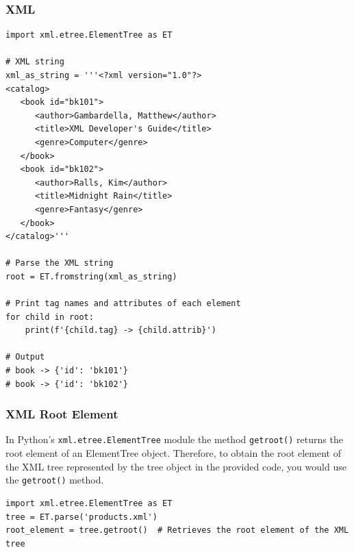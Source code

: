 
\subsubsection{XML}
\begin{codebox}
\begin{verbatim}
import xml.etree.ElementTree as ET

# XML string
xml_as_string = '''<?xml version="1.0"?>
<catalog>
   <book id="bk101">
      <author>Gambardella, Matthew</author>
      <title>XML Developer's Guide</title>
      <genre>Computer</genre>
   </book>
   <book id="bk102">
      <author>Ralls, Kim</author>
      <title>Midnight Rain</title>
      <genre>Fantasy</genre>
   </book>
</catalog>'''

# Parse the XML string
root = ET.fromstring(xml_as_string)

# Print tag names and attributes of each element
for child in root:
    print(f'{child.tag} -> {child.attrib}')

# Output
# book -> {'id': 'bk101'}
# book -> {'id': 'bk102'}
\end{verbatim}
\end{codebox}

\subsubsection{XML Root Element}

In Python's \texttt{xml.etree.ElementTree} module the method \texttt{getroot()} returns the root element of an ElementTree object. Therefore, to obtain the root element of the XML tree represented by the tree object in the provided code, you would use the \texttt{getroot()} method.

\begin{codebox}
\begin{verbatim}
import xml.etree.ElementTree as ET
tree = ET.parse('products.xml')
root_element = tree.getroot()  # Retrieves the root element of the XML tree
\end{verbatim}
\end{codebox}

\newpage

